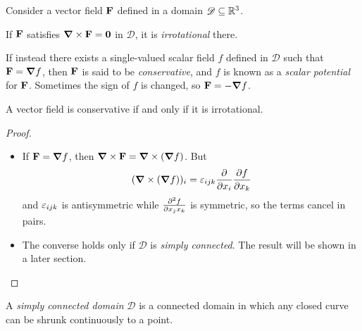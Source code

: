 \documentclass{../template/note}
\begin{document}
    Consider a vector field \(\V F\) defined in a domain \(\mathscr D \subseteq \mathbb R^3\).

    \begin{definition*}
        If \(\V F\) satisfies \(\curl \V F = \V 0\) in \(\mathscr D\), it is \emph{irrotational} there.
    \end{definition*}

    \begin{definition*}
        If instead there exists a single-valued scalar field \(f\) defined in \(\mathscr D\) such that \(\V F = \grad f\), then \(\V F\) is said to be \emph{conservative}, and \(f\) is known as a \emph{scalar potential} for \(\V F\). Sometimes the sign of \(f\) is changed, so \(\V F = -\grad f\).
    \end{definition*}
    
    \begin{proposition}
        A vector field is conservative if and only if it is irrotational.
    \end{proposition}
    
    \begin{proof}
        \begin{itemize}
            \item[\(\implies\)] If \(\V F = \grad f\), then \(\curl \V F = \curl (\grad f)\). But
            \begin{align*}
                (\curl (\grad f))_i = \lv{ijk} \pd{}{x_i} \pd{f}{x_k}
            \end{align*}
            and \(\varepsilon_{ijk}\) is antisymmetric while \(\pd{^2f}{x_jx_k}\) is symmetric, so the terms cancel in pairs.
            \item[\(\impliedby\)] The converse holds only if \(\mathscr D\) is \emph{simply connected}. The result will be shown in a later section.            
        \end{itemize}
    \end{proof}
    
    \begin{definition*}
        A \emph{simply connected domain} \(\mathscr D\) is a connected domain in which any closed curve can be shrunk continuously to a point.
    \end{definition*}
    
\end{document}
